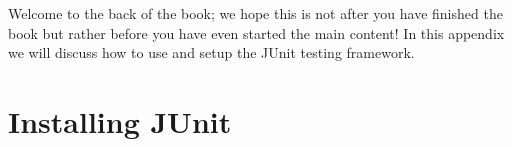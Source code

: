 Welcome to the back of the book; we hope this is not after you have finished the book but rather before you have even started the main content! In this appendix we will discuss how to use and setup the JUnit testing framework.

\section*{Installing JUnit}
